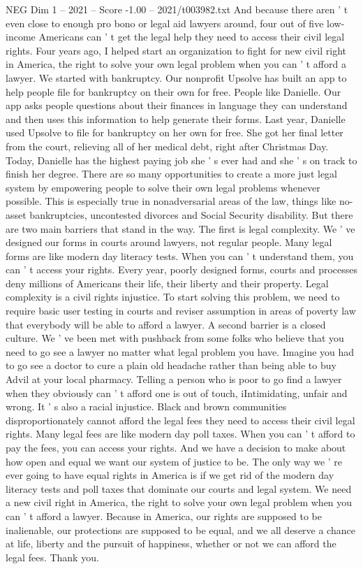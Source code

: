 \begin{textsample}{NEG Dim 1 – 2021 – Score -1.00 – 2021/t003982.txt}
And because there aren ' t even close to enough pro bono or legal aid lawyers around, four out of five low-income Americans can ' t get the legal help they need to access their civil legal rights.
Four years ago, I helped start an organization to fight for new civil right in America, the right to solve your own legal problem when you can ' t afford a lawyer.
We started with bankruptcy.
Our nonprofit Upsolve has built an app to help people file for bankruptcy on their own for free.
People like Danielle.
Our app asks people questions about their finances in language they can understand and then uses this information to help generate their forms.
Last year, Danielle used Upsolve to file for bankruptcy on her own for free.
She got her final letter from the court, relieving all of her medical debt, right after Christmas Day.
Today, Danielle has the highest paying job she ' s ever had and she ' s on track to finish her degree.
There are so many opportunities to create a more just legal system by empowering people to solve their own legal problems whenever possible.
This is especially true in nonadversarial areas of the law, things like no-asset bankruptcies, uncontested divorces and Social Security disability.
But there are two main barriers that stand in the way.
The first is legal complexity.
We ' ve designed our forms in courts around lawyers, not regular people.
Many legal forms are like modern day literacy tests.
When you can ' t understand them, you can ' t access your rights.
Every year, poorly designed forms, courts and processes deny millions of Americans their life, their liberty and their property.
Legal complexity is a civil rights injustice.
To start solving this problem, we need to require basic user testing in courts and reviser assumption in areas of poverty law that everybody will be able to afford a lawyer.
A second barrier is a closed culture.
We ' ve been met with pushback from some folks who believe that you need to go see a lawyer no matter what legal problem you have.
Imagine you had to go see a doctor to cure a plain old headache rather than being able to buy Advil at your local pharmacy.
Telling a person who is poor to go find a lawyer when they obviously can ' t afford one is out of touch, iIntimidating, unfair and wrong.
It ' s also a racial injustice.
Black and brown communities disproportionately cannot afford the legal fees they need to access their civil legal rights.
Many legal fees are like modern day poll taxes.
When you can ' t afford to pay the fees, you can access your rights.
And we have a decision to make about how open and equal we want our system of justice to be.
The only way we ' re ever going to have equal rights in America is if we get rid of the modern day literacy tests and poll taxes that dominate our courts and legal system.
We need a new civil right in America, the right to solve your own legal problem when you can ' t afford a lawyer.
Because in America, our rights are supposed to be inalienable, our protections are supposed to be equal, and we all deserve a chance at life, liberty and the pursuit of happiness, whether or not we can afford the legal fees.
Thank you.

\end{textsample}
